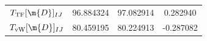 \begin{table}[ht]
\begin{tabular}{SSSS}
    \midrule
    {$T_{\text{TF}}[\m{D}]_{IJ}$} & 96.884324 & 97.082914 & 0.282940 \\
    {$T_{\text{vW}}[\m{D}]_{IJ}$} & 80.459195 & 80.224913 & -0.287082 \\

    \bottomrule
  \end{tabular}
\end{table}


